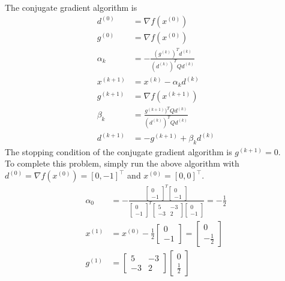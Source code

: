 \documentclass{article}
\begin{document}
\begin{enumerate}
 The conjugate gradient algorithm is
 \begin{align*}
  d^{(0)} &= \nabla f(x^{(0)}) \\
  g^{(0)} &= \nabla f(x^{(0)}) \\
  \alpha_k &= -\frac{(g^{(k)})^T d^{(k)}}{(d^{(k)})^T Q d^{(k)}} \\
   x^{(k+1)} &= x^{(k)} - \alpha_k d^{(k)} \\
   g^{(k+1)} &= \nabla f(x^{(k+1)}) \\
   \beta_k &= \frac{g^{(k+1)})^T Q d^{(k)}}{(d^{(k)})^T Q d^{(k)}} \\
   d^{(k+1)} &= - g^{(k+1)} + \beta_k d^{(k)}
 \end{align*}
The stopping condition of the conjugate gradient algorithm is $g^{(k+1)} = 0$. \\
To complete this problem, simply run the above algorithm with $d^{(0)} = \nabla f(x^{(0)}) = [0, -1]^\top$ and $x^{(0)} = [0, 0]^\top$.
\begin{align*}
  \alpha_0 &= -\frac{\begin{bmatrix}0 \\ -1\end{bmatrix}^T \begin{bmatrix}0 \\ -1\end{bmatrix}}{\begin{bmatrix}0 \\ -1\end{bmatrix}^T \begin{bmatrix}5 & -3 \\ -3 & 2\end{bmatrix}\begin{bmatrix}0 \\ -1\end{bmatrix}} = -\frac{1}{2}{} \\
  x^{(1)} &= x^{(0)} - \frac{1}{2}\begin{bmatrix}
    0 \\ -1
  \end{bmatrix} = \begin{bmatrix}
    0 \\ -\frac{1}{2}
  \end{bmatrix} \\
  g^{(1)} &= \begin{bmatrix}
    5 & -3 \\ -3 & 2
  \end{bmatrix}\begin{bmatrix}
    0 \\ \frac{1}{2}

\end{bmatrix}
\end{align*}
\end{enumerate}
\end{document}
